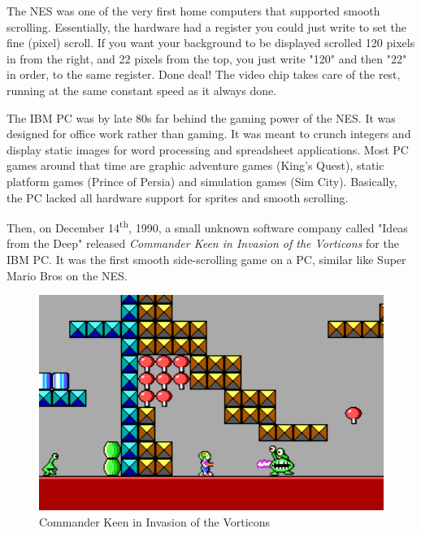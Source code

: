 \documentclass[book.tex]{subfiles}
\begin{document}
\par
The NES was one of the very first home computers that supported smooth scrolling. Essentially, the hardware had a register you could just write to set the fine (pixel) scroll. If you want your background to be displayed scrolled 120 pixels in from the right, and 22 pixels from the top, you just write "120" and then "22" in order, to the same register. Done deal! The video chip takes care of the rest, running at the same constant speed as it always done.\\
\par
The IBM PC was by late 80s far behind the gaming power of the NES. It was designed for office work rather than gaming. It was meant to crunch integers and display static images for word processing and spreadsheet applications. Most PC games around that time are graphic adventure games (King's Quest), static platform games (Prince of Persia) and simulation games (Sim City). Basically, the PC lacked all hardware support for sprites and smooth scrolling.\\
\par
Then, on December 14\textsuperscript{th}, 1990, a small unknown software company called "Ideas from the Deep" released \textit{Commander Keen in Invasion of the Vorticons} for the IBM PC. It was the first smooth side-scrolling game on a PC, similar like Super Mario Bros on the NES. \\
\begin{figure}[H]
  \centering
 \includegraphics[width=1.0\textwidth]{screenshots_300dpi/Keen_Marooned_on_Mars_gameplay.png}
\caption{Commander Keen in Invasion of the Vorticons}
\end{figure}
\par
\end{document}
